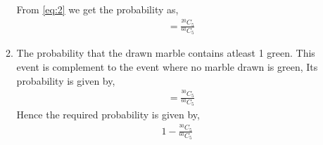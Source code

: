 \documentclass[journal,12pt,twocolumn]{IEEEtran}
\begin{document}
\begin{enumerate}
\begin{enumerate}
From \eqref{eq:2} we get the probability as,
\begin{align}
&= \frac{^{20}C_{5}}{^{60}C_{5}}
\end{align}
\item The probability that the drawn marble contains atleast 1 green. This event is complement to the event where no marble drawn is green, Its probability is given by,
\begin{align}
&= \frac{^{30}C_{5}}{^{60}C_{5}}
\end{align}
Hence the required probability is given by,
\begin{align}
1 - \frac{^{30}C_{5}}{^{60}C_{5}}
\end{align}
\end{enumerate}
\end{enumerate}
\end{document}
